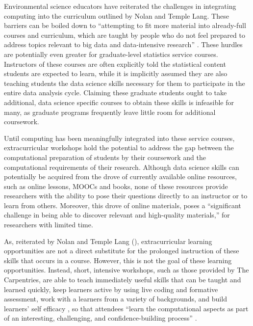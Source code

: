 \documentclass[12pt]{article}
\begin{document}
\quad Environmental science educators have reiterated the challenges in 
integrating computing into the curriculum outlined by Nolan and Temple Lang. 
These barriers can be boiled down to ``attempting to fit more material into
already-full courses and curriculum, which are taught by people who do not feel
prepared to address topics relevant to big data and data-intensive research'' 
\citep[p.\ 547]{hampton}. These hurdles are potentially even greater for 
graduate-level statistics service courses. Instructors of these courses are 
often explicitly told the statistical content students are expected to learn, 
while it is implicitly assumed they are also teaching students the data science
skills necessary for them to participate in the entire data analysis cycle.
Claiming these graduate students ought to take additional, data science specific
courses to obtain these skills is infeasible for many, as graduate programs
frequently leave little room for additional coursework. 

\quad Until computing has been meaningfully integrated into these service 
courses, extracurricular workshops hold the potential to address the gap between
the computational preparation of students by their coursework and the 
computational requirements of their research. Although data science skills can 
potentially be acquired from the drove of currently available online resources, 
such as online lessons, MOOCs and books, none of these resources provide
researchers with the ability to pose their questions directly to an instructor
or to learn from others. Moreover, this drove of online materials, poses a  
``significant challenge in being able to discover relevant and high-quality
materials,'' for researchers with limited time. 

\quad As, reiterated by Nolan and Temple Lang (\citeyear{esr}), extracurricular
learning opportunities are not a direct substitute for the prolonged instruction
of these skills that occurs in a course. However, this is not the goal 
of these learning opportunities. Instead, short, intensive workshops, such as
those provided by The Carpentries, are able to teach immediately useful skills
that can be taught and learned quickly, keep learners active by using live
coding and formative assessment, work with a learners from a variety of
backgrounds, and build learners' self efficacy \citep{null-carpentries}, so that
attendees ``learn the computational aspects as part of an interesting, 
challenging, and confidence-building process'' \citep[p.\ 101]{nolan}.
\end{document}
